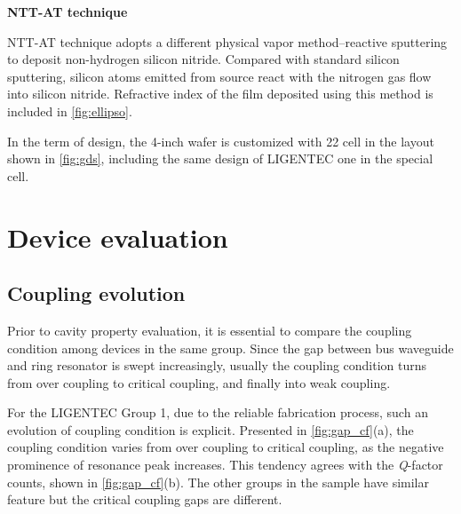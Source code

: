 \bigskip
\noindent\textbf{NTT-AT technique}

NTT-AT technique adopts a different physical vapor method--reactive sputtering to deposit non-hydrogen silicon nitride. Compared with standard silicon sputtering, silicon atoms emitted from source react with the nitrogen gas flow into silicon nitride. Refractive index of the film deposited using this method is included in \autoref{fig:ellipso}.

In the term of design, the 4-inch wafer is customized with 22 cell in the layout shown in \autoref{fig:gds}, including the same design of LIGENTEC one in the special cell.

\section{Device evaluation}

\subsection{Coupling evolution}

Prior to cavity property evaluation, it is essential to compare the coupling condition among devices in the same group. Since the gap between bus waveguide and ring resonator is swept increasingly, usually the coupling condition turns from over coupling to critical coupling, and finally into weak coupling.

For the LIGENTEC Group 1, due to the reliable fabrication process, such an evolution of coupling condition is explicit. Presented in \autoref{fig:gap_cf}(a), the coupling condition varies from over coupling to critical coupling, as the negative prominence of resonance peak increases. This tendency agrees with the \textit{Q}-factor counts, shown in \autoref{fig:gap_cf}(b). The other groups in the sample have similar feature but the critical coupling gaps are different.

\begin{figure}
	\centering
	
	\label{fig:gap_cf}
\end{figure}


